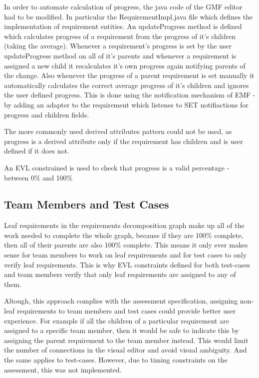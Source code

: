 \documentclass[11pt,a4paper]{scrartcl}
\begin{document}
	In order to automate calculation of progress, the java code of the GMF editor had to be modified. In particular the RequirementImpl.java file which defines the implementation of requirement entities. An updateProgress method is defined which calculates progress of a requirement from the progress of it's children (taking the average). Whenever a requirement's progress is set by the user  updateProgress method on all of it's parents and whenever a requirement is assigned a new child it recalculates it's own progress again notifying parents of the change. Also whenever the progress of a parent requirement is set manually it automatically calculates the correct average progress of it's children and ignores the user defined progress. This is done using the notification mechanism of EMF - by adding an adapter to the requirement which listenes to SET notifiactions for progress and children fields. 
	
	The more commonly used derived attributes pattern could not be used, as progress is a derived attribute only if the requirement has children and is user defined if it does not. 
	
	An EVL constrained is used to check that progress is a valid percentage - between 0\% and 100\%
	
	\subsection{Team Members and Test Cases}
	Leaf requirements in the requirements decomposition graph make up all of the work needed to complete the whole graph, because if they are 100\% complete, then all of their parents are also 100\% complete. This means it only ever makes sense for team members to work on leaf requirements and for test cases to only verify leaf requirements. This is why EVL constraints defined for both test-cases and team members verify that only leaf requirements are assigned to any of them. 
	
	Altough, this approach complies with the assessment specification, assigning non-leaf requirements to team members and test cases could provide better user experience. For example if all the children of a particular requirement are assigned to a specific team member, then it would be safe to indicate this by assigning the parent requirement to the team member instead. This would limit the number of connections in the visual editor and avoid visual ambiguity. And the same applies to test-cases. However, due to timing constraints on the assessment, this was not implemented.
	
\end{document}
